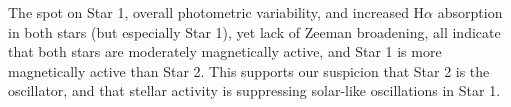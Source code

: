 The spot on Star 1, overall photometric variability, and increased H$\alpha$ absorption in both stars (but especially Star 1), yet lack of Zeeman broadening, all indicate that both stars are moderately magnetically active, and Star 1 is more magnetically active than Star 2. This supports our suspicion that Star 2 is the oscillator, and that stellar activity is suppressing solar-like oscillations in Star 1.
  
  
  
  